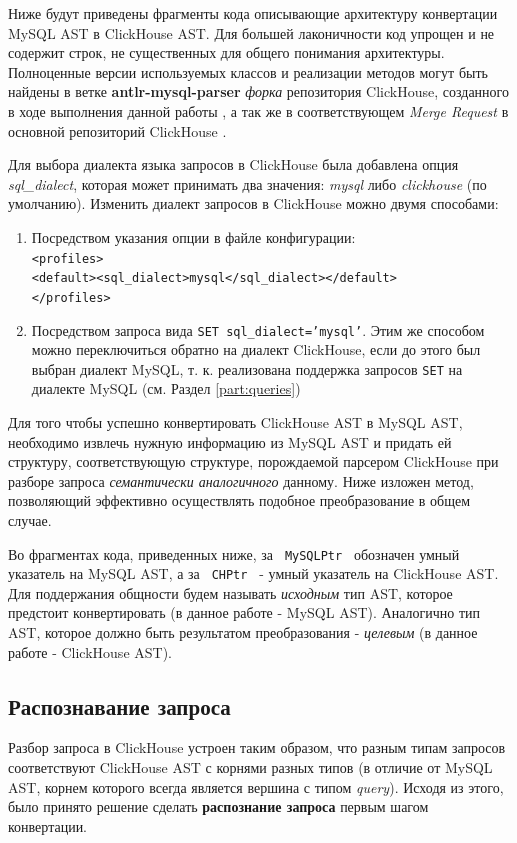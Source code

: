 Ниже будут приведены фрагменты кода описывающие архитектуру конвертации MySQL AST в ClickHouse AST. Для большей лаконичности код упрощен и не содержит строк, не существенных для общего понимания архитектуры. Полноценные версии используемых классов и реализации методов могут быть найдены в ветке \textbf{antlr-mysql-parser} \textit{форка} репозитория ClickHouse, созданного в ходе выполнения данной работы \cite{my_branch}, а так же в соответствующем \textit{Merge Request} в основной репозиторий ClickHouse \cite{merge_request}.

Для выбора диалекта языка запросов в ClickHouse была добавлена опция \textit{sql\_dialect}, которая может принимать два значения: \textit{mysql} либо \textit{clickhouse} (по умолчанию). Изменить диалект запросов в ClickHouse можно двумя способами:

\begin{enumerate}
    \item Посредством указания опции в файле конфигурации:\\ \texttt{<profiles>}\\\texttt{<default><sql_dialect>mysql</sql_dialect></default>}\\ \texttt{</profiles>}
    \item Посредством запроса вида \texttt{SET sql_dialect='mysql'}. Этим же способом можно переключиться обратно на диалект ClickHouse, если до этого был выбран диалект MySQL, т. к. реализована поддержка запросов \texttt{SET} на диалекте MySQL (см. Раздел \ref{part:queries})
\end{enumerate}

Для того чтобы успешно конвертировать ClickHouse AST в MySQL AST, необходимо извлечь нужную информацию из MySQL AST и придать ей структуру, соответствующую структуре, порождаемой парсером ClickHouse при разборе запроса \textit{семантически аналогичного} данному. Ниже изложен метод, позволяющий эффективно осуществлять подобное преобразование в общем случае.

Во фрагментах кода, приведенных ниже, за \texttt{ MySQLPtr } обозначен умный указатель на MySQL AST, а за \texttt{ CHPtr } - умный указатель на ClickHouse AST. Для поддержания общности будем называть \textit{исходным} тип AST, которое предстоит конвертировать (в данное работе - MySQL AST). Аналогично тип AST, которое должно быть результатом преобразования - \textit{целевым} (в данное работе - ClickHouse AST).

\subsection{Распознавание запроса} \label{conv:recognizer_}
Разбор запроса в ClickHouse устроен таким образом, что разным типам запросов соответствуют ClickHouse AST с корнями разных типов (в отличие от MySQL AST, корнем которого всегда является вершина с типом \textit{query}). Исходя из этого, было принято решение сделать \textbf{распознание запроса} первым шагом конвертации.

